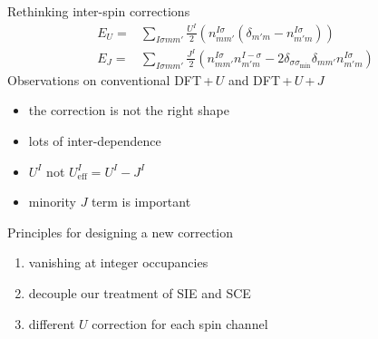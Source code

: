 \documentclass[xcolor=table,aspectratio=169]{beamer}
\numberwithin{equation}{section}
\begin{document}
% 
% 
% 
\begin{frame}{Rethinking inter-spin corrections}
    \begin{align}
        E_{U} = & \sum_{I\sigma m m'} \frac{U^I}{2} \left(n^{I\sigma}_{mm'} (\delta_{m'm} - n^{I\sigma}_{m'm})\right) \label{eqn:u_correction}                              \\
        E_{J} = & \sum_{I\sigma m m'} \frac{J^I}{2} \left( n^{I\sigma}_{mm'} n^{I-\sigma}_{m'm} - 2\delta_{\sigma \sigma_\mathrm{min}}\delta_{mm'} n^{I\sigma}_{m'm}\right)
        \label{eqn:j_correction}
    \end{align}
    Observations on conventional DFT\,+\,$U$ and DFT\,+\,$U$\,+\,$J$
    \begin{itemize}
        \item the correction is not the right shape
        \item lots of inter-dependence
        \item $U^I$ not $U^I_\mathrm{eff} = U^I - J^I$
        \item minority $J$ term is important
    \end{itemize}

    Principles for designing a new correction
    \begin{enumerate}
        \item vanishing at integer occupancies
        \item decouple our treatment of SIE and SCE
        \item different $U$ correction for each spin channel
    \end{enumerate}
\end{frame}
\end{document}
